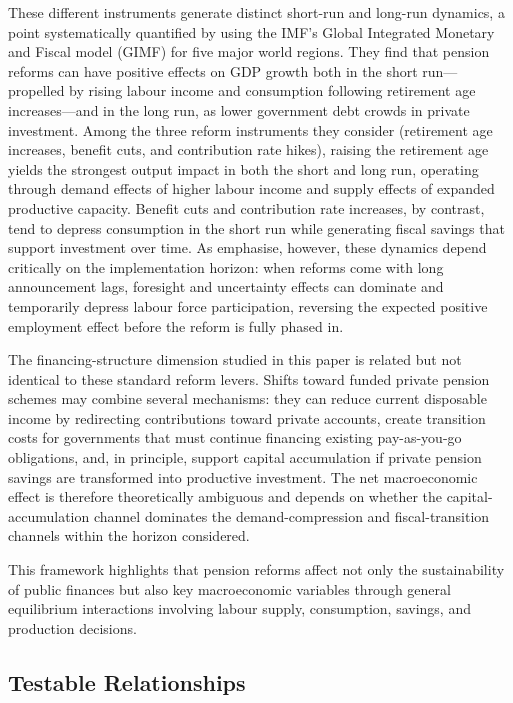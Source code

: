 \documentclass[11pt,english,a4paper, twoside, authoryear]{article}
\begin{document}
These different instruments generate distinct short-run and long-run dynamics, a point systematically quantified by \citet{KaramMuirPereiraTuladhar2010} using the IMF's Global Integrated Monetary and Fiscal model (GIMF) for five major world regions. They find that pension reforms can have positive effects on GDP growth both in the short run---propelled by rising labour income and consumption following retirement age increases---and in the long run, as lower government debt crowds in private investment. Among the three reform instruments they consider (retirement age increases, benefit cuts, and contribution rate hikes), raising the retirement age yields the strongest output impact in both the short and long run, operating through demand effects of higher labour income and supply effects of expanded productive capacity. Benefit cuts and contribution rate increases, by contrast, tend to depress consumption in the short run while generating fiscal savings that support investment over time. As \citet{BiZubairy2023} emphasise, however, these dynamics depend critically on the implementation horizon: when reforms come with long announcement lags, foresight and uncertainty effects can dominate and temporarily depress labour force participation, reversing the expected positive employment effect before the reform is fully phased in.

The financing-structure dimension studied in this paper is related but not identical to these standard reform levers. Shifts toward funded private pension schemes may combine several mechanisms: they can reduce current disposable income by redirecting contributions toward private accounts, create transition costs for governments that must continue financing existing pay-as-you-go obligations, and, in principle, support capital accumulation if private pension savings are transformed into productive investment. The net macroeconomic effect is therefore theoretically ambiguous and depends on whether the capital-accumulation channel dominates the demand-compression and fiscal-transition channels within the horizon considered.


This framework highlights that pension reforms affect not only the sustainability of public finances but also key macroeconomic variables through general equilibrium interactions involving labour supply, consumption, savings, and production decisions.

\subsection{Testable Relationships}\label{sec:TR}
\end{document}
